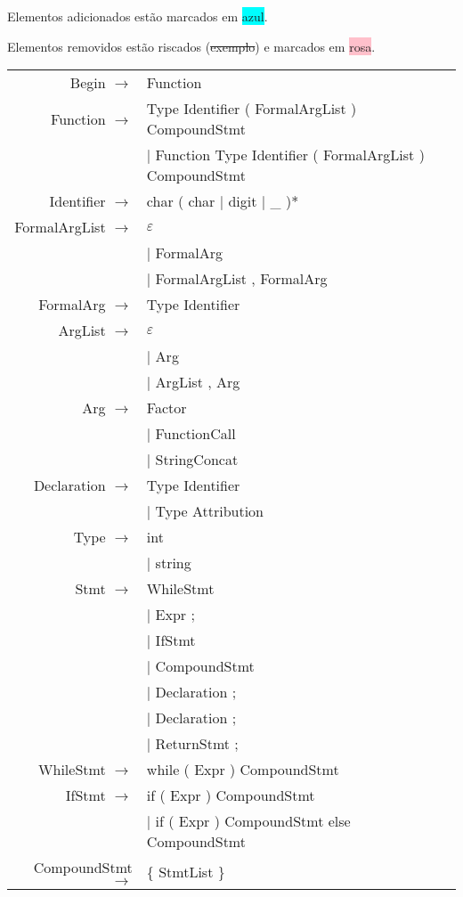 \documentclass[12pt]{article}
\begin{document}
Elementos adicionados estão marcados em \colorbox{cyan}{azul}.

Elementos removidos estão riscados (\sout{exemplo}) e marcados em \colorbox{pink}{rosa}.

\begin{longtable}{ r l }
	Begin 			$\rightarrow$ 	& Function \\
	Function 		$\rightarrow$ 	& Type Identifier ( FormalArgList ) CompoundStmt \\
									& $|$ Function Type Identifier ( FormalArgList ) CompoundStmt \\
	Identifier		$\rightarrow$   & char ( char $|$ digit $|$ \_ )* \\
	FormalArgList 	$\rightarrow$ 	& $\varepsilon$ \\
									& $|$ FormalArg \\
									& $|$ FormalArgList , FormalArg \\
	FormalArg 		$\rightarrow$ 	& Type Identifier \\
	ArgList			$\rightarrow$ 	& $\varepsilon$ \\
									& $|$ Arg \\
									& $|$ ArgList , Arg \\
	Arg				$\rightarrow$ 	& Factor \\
									& $|$ FunctionCall \\
									& $|$ StringConcat \\
	Declaration		$\rightarrow$ 	& Type Identifier \\
									& $|$ Type Attribution \\
	Type			$\rightarrow$ 	& int \\
									& $|$ string \\
	Stmt 			$\rightarrow$ 	& WhileStmt \\
									& $|$ Expr ; \\
									& $|$ IfStmt \\
									& $|$ CompoundStmt \\
									& $|$ Declaration ;\\
									& $|$ Declaration ; \\
									& $|$ ReturnStmt ; \\
	WhileStmt		$\rightarrow$ 	& while ( Expr ) CompoundStmt \\
	IfStmt			$\rightarrow$ 	& if ( Expr ) CompoundStmt \\
									& $|$ if ( Expr ) CompoundStmt else CompoundStmt \\
	CompoundStmt	$\rightarrow$ 	& \{ StmtList \} \\

\end{longtable}
\end{document}
